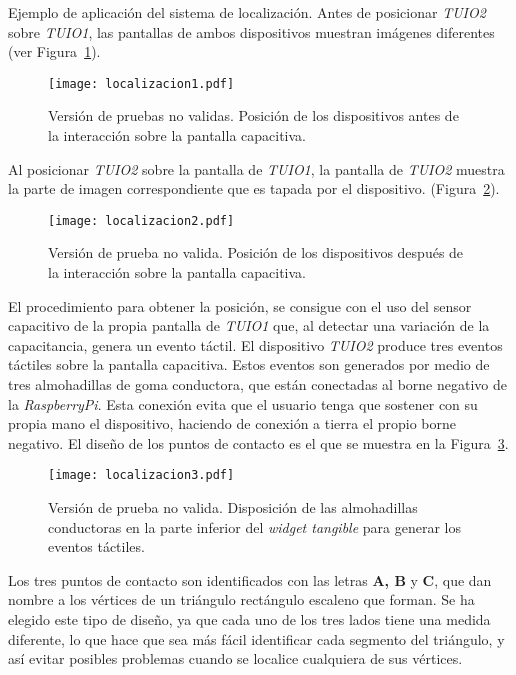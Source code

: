 Ejemplo de aplicación del sistema de localización. Antes de posicionar \emph{TUIO2} sobre \emph{TUIO1}, las pantallas de ambos dispositivos muestran imágenes diferentes (ver Figura~\ref{fig:Localizacion1}).
\begin{figure}[!h]
\begin{center}
\texttt{[image: localizacion1.pdf]}
\caption{Versión de pruebas no validas. Posición de los dispositivos antes de la interacción sobre la pantalla capacitiva.}
\label{fig:Localizacion1}
\end{center}
\end{figure}
Al posicionar \emph{TUIO2} sobre la pantalla de \emph{TUIO1}, la pantalla de \emph{TUIO2} muestra la parte de imagen correspondiente que es tapada por el dispositivo. (Figura~\ref{fig:Localizacion2}).
\begin{figure}[!h]
\begin{center}
\texttt{[image: localizacion2.pdf]}
\caption{Versión de prueba no valida. Posición de los dispositivos después de la interacción sobre la pantalla capacitiva.}
\label{fig:Localizacion2}
\end{center}
\end{figure}

El procedimiento para obtener la posición, se consigue con el uso del sensor capacitivo de la propia pantalla de \emph{TUIO1} que, al detectar una variación de la capacitancia, genera un evento táctil.
El dispositivo \emph{TUIO2} produce tres eventos táctiles sobre la pantalla capacitiva. Estos eventos son generados por medio de tres almohadillas de goma conductora, que están conectadas al borne negativo de la \emph{RaspberryPi}. Esta conexión evita que el usuario tenga que sostener con su propia mano el dispositivo, haciendo de conexión a tierra el propio borne negativo.
El diseño de los puntos de contacto es el que se muestra en la Figura~\ref{fig:Localizacion3}.
\begin{figure}[!h]
\begin{center}
\texttt{[image: localizacion3.pdf]}
\caption{Versión de prueba no valida. Disposición de las almohadillas conductoras en la parte inferior del \emph{widget tangible} para generar los eventos táctiles. }
\label{fig:Localizacion3}
\end{center}
\end{figure}
Los tres puntos de contacto son identificados con las letras \textbf{A, B} y \textbf{C}, que dan nombre a los vértices de un triángulo rectángulo escaleno que forman. Se ha elegido este tipo de diseño, ya que cada uno de los tres lados tiene una medida diferente, lo que hace que sea más fácil identificar cada segmento del triángulo, y así evitar posibles problemas cuando se localice cualquiera de sus vértices.

